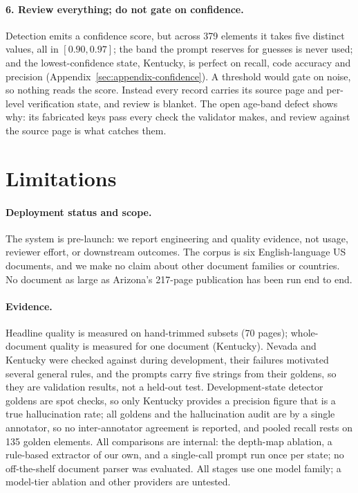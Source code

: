 \documentclass[letterpaper]{article} %
\begin{document}
\paragraph{6. Review everything; do not gate on confidence.} Detection emits a
confidence score, but across 379 elements it takes five distinct values, all
in $[0.90, 0.97]$; the band the prompt reserves for guesses is never used; and
the lowest-confidence state, Kentucky, is perfect on recall, code accuracy and
precision (Appendix~\ref{sec:appendix-confidence}). A threshold would gate on
noise, so nothing reads the score. Instead every record carries its source
page and per-level verification state, and review is blanket. The open
age-band defect shows why: its fabricated keys pass every check the validator
makes, and review against the source page is what catches them.

\section{Limitations}
\label{sec:limitations}\label{sec:discussion-limitations}

\paragraph{Deployment status and scope.} The system is pre-launch: we report
engineering and quality evidence, not usage, reviewer effort, or downstream
outcomes. The corpus is six English-language US documents, and we make no
claim about other document families or countries. No document as large as
Arizona's 217-page publication has been run end to end.

\paragraph{Evidence.} Headline quality is measured on hand-trimmed subsets
(70 pages); whole-document quality is measured for one document (Kentucky).
Nevada and Kentucky were checked against during development, their failures
motivated several general rules, and the prompts carry five strings from their
goldens, so they are validation results, not a held-out test.
Development-state detector goldens are spot checks, so only Kentucky provides
a precision figure that is a true hallucination rate; all goldens and the
hallucination audit are by a single annotator, so no inter-annotator agreement
is reported, and pooled recall rests on 135 golden elements. All comparisons
are internal: the depth-map ablation, a rule-based extractor of our own, and a
single-call prompt run once per state; no off-the-shelf document parser was
evaluated. All stages use one model family; a model-tier ablation and other
providers are untested.
\end{document}
